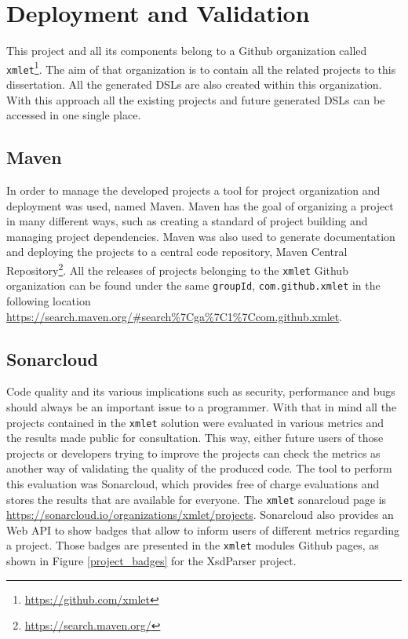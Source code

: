 \chapter{Deployment and Validation}
\label{cha:deployment}

This project and all its components belong to a Github organization called \texttt{xmlet}\footnote{\url{https://github.com/xmlet}}. The aim of that organization is to contain all the related projects to this dissertation. All the generated \ac{DSL}s are also created within this organization. With this approach all the existing projects and future generated \ac{DSL}s can be accessed in one single place.

\section{Maven} %
\label{sec:maven}

In order to manage the developed projects a tool for project organization and deployment was used, named Maven\cite{maven}. Maven has the goal of organizing a project in many different ways, such as creating a standard of project building and managing project dependencies. Maven was also used to generate documentation and deploying the projects to a central code repository, Maven Central Repository\footnote{\url{https://search.maven.org/}}. All the releases of projects belonging to the \texttt{xmlet} Github organization can be found under the same \texttt{groupId}, \texttt{com.github.xmlet} in the following location \url{https://search.maven.org/#search%7Cga%7C1%7Ccom.github.xmlet}. 

\section{Sonarcloud} %
\label{sec:sonarcloud}

Code quality and its various implications such as security, performance and bugs should always be an important issue to a programmer. With that in mind all the projects contained in the \texttt{xmlet} solution were evaluated in various metrics and the results made public for consultation. This way, either future users of those projects or developers trying to improve the projects can check the metrics as another way of validating the quality of the produced code. The tool to perform this evaluation was Sonarcloud, which provides free of charge evaluations and stores the results that are available for everyone. The \texttt{xmlet} sonarcloud page is \url{https://sonarcloud.io/organizations/xmlet/projects}. Sonarcloud also provides an Web \ac{API} to show badges that allow to inform users of different metrics regarding a project. Those badges are presented in the \texttt{xmlet} modules Github pages, as shown in Figure \ref{project_badges} for the XsdParser project.

